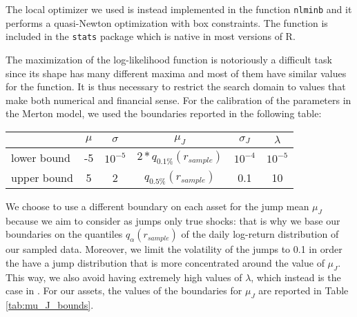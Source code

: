 The local optimizer we used is instead implemented in the function \texttt{nlminb} and it performs a quasi-Newton optimization with box constraints. The function is included in the \texttt{stats} package which is native in most versions of R.

\bigskip
The maximization of the log-likelihood function is notoriously a difficult task since its shape has many different maxima and most of them have similar values for the function. It is thus necessary to restrict the search domain to values that make both numerical and financial sense.
For the calibration of the parameters in the Merton model, we used the  boundaries reported in the following table:
\bigskip

\begin{center}
	\begin{tabular}{lccccc}
		
		&$\mu$ & $\sigma$ & $\mu_J$ & $\sigma_J$ & $\lambda$ \\
		\midrule
		lower bound & -5 & $10^{-5}$ & $2*q_{0.1\%}(r_{sample})$ &$10^{-4}$ &$10^{-5}$\\
		upper bound & 5 & 2 & $q_{0.5\%}(r_{sample})$ & 0.1& 10\\
		\midrule
	\end{tabular}
\end{center}


\bigskip
We choose to use a different boundary on each asset for the jump mean $\mu_J$  because we aim to consider as jumps only true shocks: that is why we base our boundaries on the quantiles $q_{\alpha}(r_{sample})$ of the daily log-return distribution of our sampled data. 
Moreover, we limit the volatility of the jumps to 0.1 in order the have  a jump distribution that is more concentrated around the value of $\mu_J$.
This way, we also avoid having extremely high values of $\lambda$, which instead is the case in \citep{HONORE1998}. 
For our assets, the values of the boundaries for $\mu_J$ are reported in Table \ref{tab:mu_J_bounds}.


